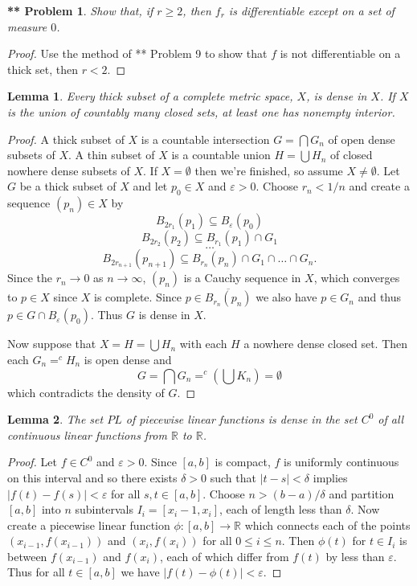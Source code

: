 \documentclass{article}
\newtheorem{**}{** Problem}
\newtheorem{lemma}{Lemma}
\begin{document}
\begin{flushleft}
\begin{**}
Show that, if $r \geq 2$, then $f_r$ is differentiable except on a set of measure $0$.
\end{**}
\begin{proof}
Use the method of ** Problem 9 to show that $f$ is not differentiable on a thick set, then $r < 2$.
\end{proof}

\begin{lemma}
Every thick subset of a complete metric space, $X$, is dense in $X$. If $X$ is the union of countably many closed sets, at least one has nonempty interior.
\end{lemma}
\begin{proof}
A thick subset of $X$ is a countable intersection $G = \bigcap G_n$ of open dense subsets of $X$. A thin subset of $X$ is a countable union $H = \bigcup H_n$ of closed nowhere dense subsets of $X$. If $X = \emptyset$ then we're finished, so assume $X \neq \emptyset$. Let $G$ be a thick subset of $X$ and let $p_0 \in X$ and $\varepsilon > 0$. Choose $r_n < 1/n$ and create a sequence $(p_n) \in X$ by
\[
B_{2r_1} (p_1) \subseteq B_{\varepsilon} (p_0)
\]
\[
B_{2r_2} (p_2) \subseteq B_{r_1} (p_1) \cap G_1
\]
\[
\dots
\]
\[
B_{2r_{n+1}} (p_{n+1}) \subseteq B_{r_n} (p_n) \cap G_1 \cap \dots \cap G_n.
\]
Since the $r_n \rightarrow 0$ as $n \rightarrow \infty$, $(p_n)$ is a Cauchy sequence in $X$, which converges to $p \in X$ since $X$ is complete. Since $p \in \overline{B_{r_n} (p_n)}$ we also have $p \in G_n$ and thus $p \in G \cap B_{\varepsilon} (p_0)$. Thus $G$ is dense in $X$.\newline

Now suppose that $X = H = \bigcup H_n$ with each $H$ a nowhere dense closed set. Then each $G_n = ^c H_n$ is open dense and
\[
G = \bigcap G_n = ^c \left ( \bigcup K_n \right ) = \emptyset
\]
which contradicts the density of $G$.
\end{proof}

\begin{lemma}
The set $PL$ of piecewise linear functions is dense in the set $C^0$ of all continuous linear functions from $\mathbb{R}$ to $\mathbb{R}$.
\end{lemma}
\begin{proof}
Let $f \in C^0$ and $\varepsilon > 0$. Since $[a,b]$ is compact, $f$ is uniformly continuous on this interval and so there exists $\delta > 0$ such that $|t-s| < \delta$ implies $|f(t) - f(s)| < \varepsilon$ for all $s,t \in [a,b]$. Choose $n > (b-a)/\delta$ and partition $[a,b]$ into $n$ subintervals $I_i = [x_i-1, x_i]$, each of length less than $\delta$. Now create a piecewise linear function $\phi : [a,b] \rightarrow \mathbb{R}$ which connects each of the points $(x_{i-1}, f(x_{i-1}))$ and $(x_i, f(x_i))$ for all $0 \leq i \leq n$. Then $\phi(t)$ for $t \in I_i$ is between $f(x_{i-1})$ and $f(x_i)$, each of which differ from $f(t)$ by less than $\varepsilon$. Thus for all $t \in [a,b]$ we have $|f(t) - \phi(t)| < \varepsilon$.
\end{proof}


\end{flushleft}
\end{document}
